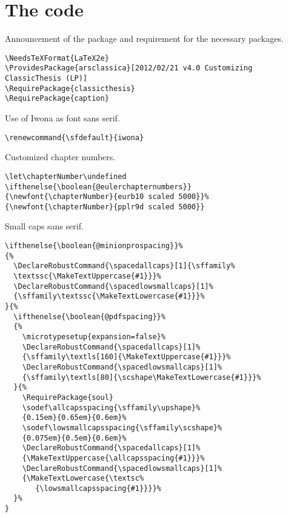 \chapter{The code}
\label{chp:code}


\lstset{numbers=left,
    numberstyle=\scriptsize,
    stepnumber=1,
    numbersep=8pt}

Announcement of the package and requirement for the necessary packages.
\begin{lstlisting}[firstnumber=1]
\NeedsTeXFormat{LaTeX2e}
\ProvidesPackage{arsclassica}[2012/02/21 v4.0 Customizing ClassicThesis (LP)]
\RequirePackage{classicthesis}
\RequirePackage{caption}
\end{lstlisting}


Use of Iwona as font sans serif.
\begin{lstlisting}
\renewcommand{\sfdefault}{iwona}
\end{lstlisting}


Customized chapter numbers.
\begin{lstlisting}
\let\chapterNumber\undefined
\ifthenelse{\boolean{@eulerchapternumbers}}
{\newfont{\chapterNumber}{eurb10 scaled 5000}}%
{\newfont{\chapterNumber}{pplr9d scaled 5000}}
\end{lstlisting}



Small caps sans serif.
\begin{lstlisting}
\ifthenelse{\boolean{@minionprospacing}}%
{%
  \DeclareRobustCommand{\spacedallcaps}[1]{\sffamily%
  \textssc{\MakeTextUppercase{#1}}}%
  \DeclareRobustCommand{\spacedlowsmallcaps}[1]%
  {\sffamily\textssc{\MakeTextLowercase{#1}}}%
}{%
  \ifthenelse{\boolean{@pdfspacing}}%
  {%
    \microtypesetup{expansion=false}%
    \DeclareRobustCommand{\spacedallcaps}[1]%
    {\sffamily\textls[160]{\MakeTextUppercase{#1}}}%
    \DeclareRobustCommand{\spacedlowsmallcaps}[1]%
    {\sffamily\textls[80]{\scshape\MakeTextLowercase{#1}}}%
  }{%
    \RequirePackage{soul}
    \sodef\allcapsspacing{\sffamily\upshape}%
    {0.15em}{0.65em}{0.6em}%
    \sodef\lowsmallcapsspacing{\sffamily\scshape}%
    {0.075em}{0.5em}{0.6em}%
    \DeclareRobustCommand{\spacedallcaps}[1]%
    {\MakeTextUppercase{\allcapsspacing{#1}}}%
	\DeclareRobustCommand{\spacedlowsmallcaps}[1]%
	{\MakeTextLowercase{\textsc%
	   {\lowsmallcapsspacing{#1}}}}%
  }%
}
\end{lstlisting}



